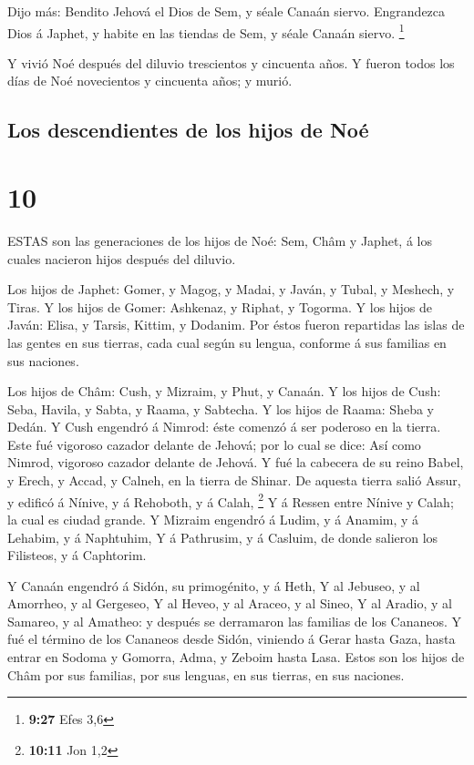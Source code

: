  Dijo más: Bendito Jehová el Dios de Sem, y séale Canaán
siervo.  Engrandezca Dios á Japhet, y habite en las tiendas
de Sem, y séale Canaán siervo. \footnote{\textbf{9:27} Efes 3,6}

 Y vivió Noé después del diluvio trescientos y cincuenta
años.  Y fueron todos los días de Noé novecientos y
cincuenta años; y murió.

\hypertarget{los-descendientes-de-los-hijos-de-nouxe9}{%
\subsection{Los descendientes de los hijos de
Noé}\label{los-descendientes-de-los-hijos-de-nouxe9}}

\hypertarget{section-9}{%
\section{10}\label{section-9}}

 ESTAS son las generaciones de los hijos de Noé: Sem, Châm y
Japhet, á los cuales nacieron hijos después del diluvio.

 Los hijos de Japhet: Gomer, y Magog, y Madai, y Javán, y
Tubal, y Meshech, y Tiras.  Y los hijos de Gomer: Ashkenaz,
y Riphat, y Togorma.  Y los hijos de Javán: Elisa, y Tarsis,
Kittim, y Dodanim.  Por éstos fueron repartidas las islas de
las gentes en sus tierras, cada cual según su lengua, conforme á sus
familias en sus naciones.

 Los hijos de Châm: Cush, y Mizraim, y Phut, y Canaán.
 Y los hijos de Cush: Seba, Havila, y Sabta, y Raama, y
Sabtecha. Y los hijos de Raama: Sheba y Dedán.  Y Cush
engendró á Nimrod: éste comenzó á ser poderoso en la tierra.
 Este fué vigoroso cazador delante de Jehová; por lo cual se
dice: Así como Nimrod, vigoroso cazador delante de Jehová. 
Y fué la cabecera de su reino Babel, y Erech, y Accad, y Calneh, en la
tierra de Shinar.  De aquesta tierra salió Assur, y edificó
á Nínive, y á Rehoboth, y á Calah, \footnote{\textbf{10:11} Jon 1,2}
 Y á Ressen entre Nínive y Calah; la cual es ciudad grande.
 Y Mizraim engendró á Ludim, y á Anamim, y á Lehabim, y á
Naphtuhim,  Y á Pathrusim, y á Casluim, de donde salieron
los Filisteos, y á Caphtorim.

 Y Canaán engendró á Sidón, su primogénito, y á Heth,
 Y al Jebuseo, y al Amorrheo, y al Gergeseo, 
Y al Heveo, y al Araceo, y al Sineo,  Y al Aradio, y al
Samareo, y al Amatheo: y después se derramaron las familias de los
Cananeos.  Y fué el término de los Cananeos desde Sidón,
viniendo á Gerar hasta Gaza, hasta entrar en Sodoma y Gomorra, Adma, y
Zeboim hasta Lasa.  Estos son los hijos de Châm por sus
familias, por sus lenguas, en sus tierras, en sus naciones.

